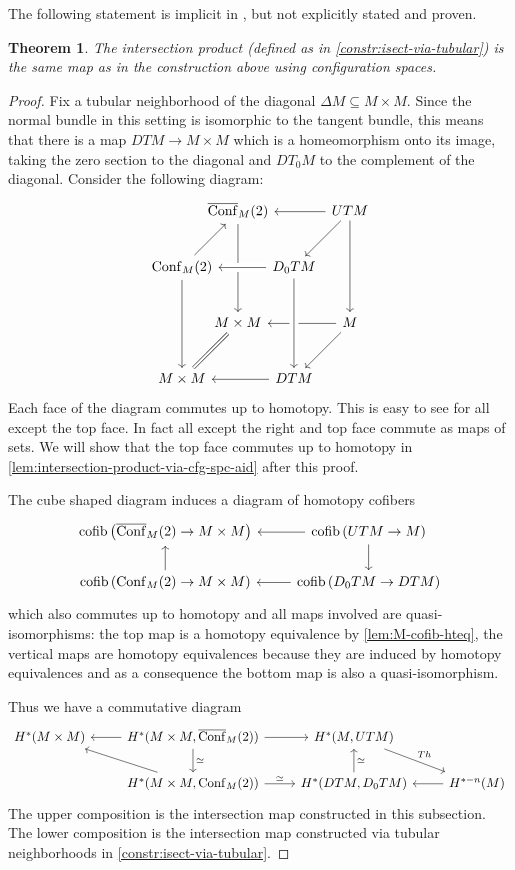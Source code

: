 \documentclass{scrartcl}
\theoremstyle{plain}
\newtheorem{theorem}{Theorem}[section]
\theoremstyle{definition}
\renewcommand{\subset}{\subseteq}
\DeclareMathOperator{\cofib}{cofib}
\newcommand{\quiso}{\simeq}
\DeclareMathOperator{\Conf}{Conf}
\DeclareMathOperator{\cConf}{\overline{Conf}}
\begin{document}
    
The following statement is implicit in \cite{naef2019string}, but not explicitly stated and proven. 
\begin{theorem}\label{thm:intersection-product-via-cfg-spc}
    The intersection product (defined as in \cref{constr:isect-via-tubular}) is the same map as in the construction above using configuration spaces. 
\end{theorem}
\begin{proof}
    Fix a tubular neighborhood of the diagonal $\Delta M\subset M\times M$. Since the normal bundle in this setting is isomorphic to the tangent bundle, this means that there is a map $DTM \to M\times M$ which is a homeomorphism onto its image, taking the zero section to the diagonal and $DT_0M$ to the complement of the diagonal. 
    Consider the following diagram:
    \[\begin{tikzcd}[row sep={40,between origins}, column sep={40,between origins}]
      & \cConf_M(2)  \ar{dd} & &   UTM  \ar{dd}\ar{ll} \ar{dl} \\
      \Conf_M(2) \ar{ur} \ar{dd} & & \ar[crossing over]{ll} D_0TM \\
        & M\times M \ar[dl, equal] & &  M  \ar{ll}\ar{dl} \\
      M\times M && DTM \ar[from=uu,crossing over] \ar{ll}
   \end{tikzcd}\]
   Each face of the diagram commutes up to homotopy. This is easy to see for all except the top face. In fact all except the right and top face commute as maps of sets. We will show that the top face commutes up to homotopy in \cref{lem:intersection-product-via-cfg-spc-aid} after this proof. 
   
   
   The cube shaped diagram induces a diagram of homotopy cofibers
   \begin{equation}
    \begin{tikzcd}
        \cofib\left(\cConf_M(2)\to M\times M\right) & \lar \cofib\left(UTM\to M\right) \dar \\
        \cofib\left(\Conf_M(2) \to M\times M\right) \uar &\lar \cofib\left(D_0TM\to DTM\right)
    \end{tikzcd}
    \end{equation}
    which also commutes up to homotopy and all maps involved are quasi-isomorphisms: the top map is a homotopy equivalence by \cref{lem:M-cofib-hteq}, the vertical maps are homotopy equivalences because they are induced by homotopy equivalences and as a consequence the bottom map is also a quasi-isomorphism. 

    Thus we have a commutative diagram
    \[\begin{tikzcd}
        H^*(M\times M)  & \dar["\quiso"] \lar H^*(M\times M, \cConf_M(2)) \rar &   H^*(M, UTM) \ar[rd, "Th"] &\\
        & \ar[ul] H^*(M\times M, \Conf_M(2))  \rar["\quiso"] & \uar[swap, "\quiso"]  H^*(DTM, D_0TM) & \lar H^{*-n}(M)
    \end{tikzcd}\]
    The upper composition is the intersection map constructed in this subsection. The lower composition is the intersection map constructed via tubular neighborhoods in \cref{constr:isect-via-tubular}.
\end{proof}
\end{document}
